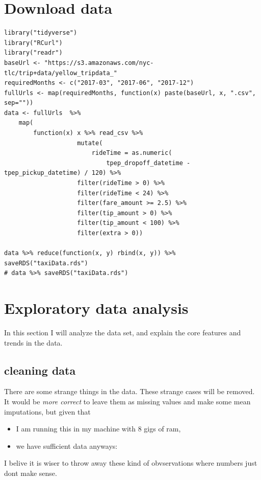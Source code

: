 \documentclass[11pt]{article}
\author{joaquin}
\date{\today}
\title{}
\begin{document}
\tableofcontents



\section{Download data}
\label{sec:org8fef7bd}

\begin{verbatim}
library("tidyverse")
library("RCurl")
library("readr")
baseUrl <- "https://s3.amazonaws.com/nyc-tlc/trip+data/yellow_tripdata_"
requiredMonths <- c("2017-03", "2017-06", "2017-12")
fullUrls <- map(requiredMonths, function(x) paste(baseUrl, x, ".csv", sep=""))
data <- fullUrls  %>%
    map(
        function(x) x %>% read_csv %>% 
                    mutate(
                        rideTime = as.numeric(
                            tpep_dropoff_datetime - tpep_pickup_datetime) / 120) %>%
                    filter(rideTime > 0) %>%
                    filter(rideTime < 24) %>%
                    filter(fare_amount >= 2.5) %>%
                    filter(tip_amount > 0) %>%
                    filter(tip_amount < 100) %>%
                    filter(extra > 0))

data %>% reduce(function(x, y) rbind(x, y)) %>% saveRDS("taxiData.rds")
# data %>% saveRDS("taxiData.rds")
\end{verbatim}



\section{Exploratory data analysis}
\label{sec:org9d97f93}

In this section I will analyze the data set, and explain the core
features and trends in the data.

\subsection{cleaning data}
\label{sec:org096b925}
There are some strange things in the data. These strange cases will be removed.
It would be \emph{more correct} to leave them as missing values and make some mean
imputations, but given that
\begin{itemize}
\item I am running this in my machine with 8 gigs of ram,
\item we have sufficient data anyways:
\end{itemize}
I belive it is wiser to throw away these kind of obvservations where numbers just dont
make sense.
\end{document}
